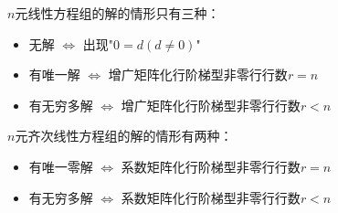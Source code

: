 \begin{theorem}[线性方程组解的情况及判定准则]
    $n$元线性方程组的解的情形只有三种：
    \begin{itemize}
        \item 无解 $\Longleftrightarrow$ 出现"$0=d(d\neq0)$"
        \item 有唯一解 $\Longleftrightarrow$ 增广矩阵化行阶梯型非零行行数$r=n$
        \item 有无穷多解 $\Longleftrightarrow$ 增广矩阵化行阶梯型非零行行数$r<n$
    \end{itemize}
\end{theorem}
\begin{corollary}
    $n$元齐次线性方程组的解的情形有两种：
    \begin{itemize}
        \item 有唯一零解  $\Longleftrightarrow$ 系数矩阵化行阶梯型非零行行数$r=n$
        \item 有无穷多解 $\Longleftrightarrow$ 系数矩阵化行阶梯型非零行行数$r<n$
    \end{itemize}
\end{corollary}